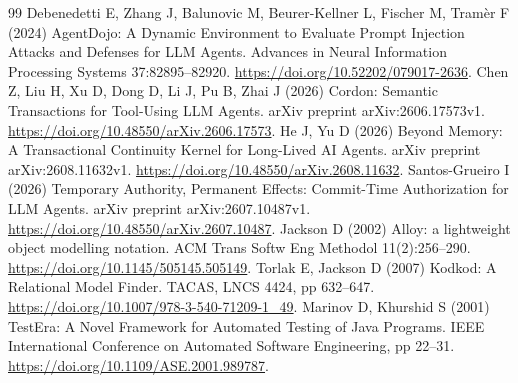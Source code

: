 \documentclass[10pt,a4paper,twocolumn]{article}
\begin{document}
\begin{thebibliography}{99}
 Debenedetti E, Zhang J, Balunovic M, Beurer-Kellner L, Fischer M, Tram\`er F (2024) AgentDojo: A Dynamic Environment to Evaluate Prompt Injection Attacks and Defenses for LLM Agents. Advances in Neural Information Processing Systems 37:82895--82920. \url{https://doi.org/10.52202/079017-2636}.
 Chen Z, Liu H, Xu D, Dong D, Li J, Pu B, Zhai J (2026) Cordon: Semantic Transactions for Tool-Using LLM Agents. arXiv preprint arXiv:2606.17573v1. \url{https://doi.org/10.48550/arXiv.2606.17573}.
 He J, Yu D (2026) Beyond Memory: A Transactional Continuity Kernel for Long-Lived AI Agents. arXiv preprint arXiv:2608.11632v1. \url{https://doi.org/10.48550/arXiv.2608.11632}.
 Santos-Grueiro I (2026) Temporary Authority, Permanent Effects: Commit-Time Authorization for LLM Agents. arXiv preprint arXiv:2607.10487v1. \url{https://doi.org/10.48550/arXiv.2607.10487}.
 Jackson D (2002) Alloy: a lightweight object modelling notation. ACM Trans Softw Eng Methodol 11(2):256--290. \url{https://doi.org/10.1145/505145.505149}.
 Torlak E, Jackson D (2007) Kodkod: A Relational Model Finder. TACAS, LNCS 4424, pp 632--647. \url{https://doi.org/10.1007/978-3-540-71209-1_49}.
 Marinov D, Khurshid S (2001) TestEra: A Novel Framework for Automated Testing of Java Programs. IEEE International Conference on Automated Software Engineering, pp 22--31. \url{https://doi.org/10.1109/ASE.2001.989787}.
\end{thebibliography}
\end{document}
